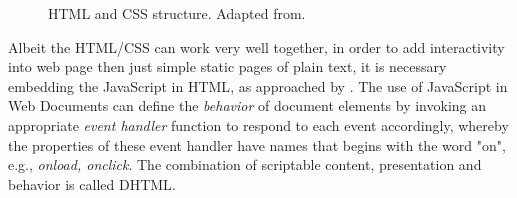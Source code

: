 \begin{figure}[htpb!]
    \centering
    \caption{HTML and CSS structure. Adapted from\cite{FELKE-MORRIS:2019}.}
    \label{fig:html&css}
\end{figure}

Albeit the \gls{HTML}/\gls{CSS} can work very well together, in order to add interactivity into web page then just simple static pages of plain text, it is necessary embedding the JavaScript in \gls{HTML}, as approached by \cite{FLANAGAN:2011}. The use of JavaScript in Web Documents can define the \textit{behavior} of document elements by invoking an appropriate \textit{event handler} function to respond to each event accordingly, whereby the properties of these event handler have names that begins with the word "on", e.g., \textit{onload, onclick}. The combination of scriptable content, presentation and behavior is called \gls{DHTML}. 

